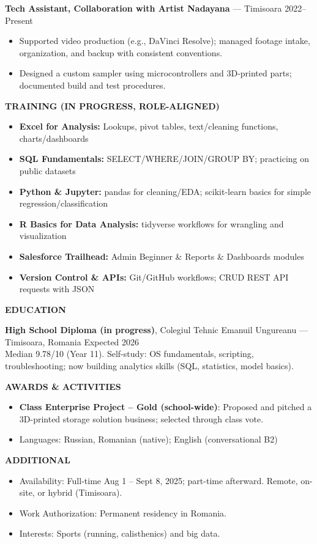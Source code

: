 \documentclass[11pt,a4paper]{article}
\newcommand{\sectionheader}[1]{\vspace{6pt}\textbf{\large #1}\par\vspace{4pt}}
\begin{document}
\textbf{Tech Assistant, Collaboration with Artist Nadayana} — Timisoara \hfill 2022–Present\\[-2pt]
\begin{itemize}
  \item Supported video production (e.g., DaVinci Resolve); managed footage intake, organization, and backup with consistent conventions.
  \item Designed a custom sampler using microcontrollers and 3D-printed parts; documented build and test procedures.
\end{itemize}

\sectionheader{TRAINING (IN PROGRESS, ROLE-ALIGNED)}
\begin{itemize}
  \item \textbf{Excel for Analysis:} Lookups, pivot tables, text/cleaning functions, charts/dashboards
  \item \textbf{SQL Fundamentals:} SELECT/WHERE/JOIN/GROUP BY; practicing on public datasets
  \item \textbf{Python \& Jupyter:} pandas for cleaning/EDA; scikit-learn basics for simple regression/classification
  \item \textbf{R Basics for Data Analysis:} tidyverse workflows for wrangling and visualization
  \item \textbf{Salesforce Trailhead:} Admin Beginner \& Reports \& Dashboards modules
  \item \textbf{Version Control \& APIs:} Git/GitHub workflows; CRUD REST API requests with JSON
\end{itemize}

\sectionheader{EDUCATION}
\textbf{High School Diploma (in progress)}, Colegiul Tehnic Emanuil Ungureanu — Timisoara, Romania \hfill Expected 2026\\
Median 9.78/10 (Year 11). Self-study: OS fundamentals, scripting, troubleshooting; now building analytics skills (SQL, statistics, model basics).

\sectionheader{AWARDS \& ACTIVITIES}
\begin{itemize}
  \item \textbf{Class Enterprise Project – Gold (school-wide)}: Proposed and pitched a 3D-printed storage solution business; selected through class vote.
  \item Languages: Russian, Romanian (native); English (conversational B2)
\end{itemize}

\sectionheader{ADDITIONAL}
\begin{itemize}
  \item Availability: Full-time Aug 1 – Sept 8, 2025; part-time afterward. Remote, on-site, or hybrid (Timisoara).
  \item Work Authorization: Permanent residency in Romania.
  \item Interests: Sports (running, calisthenics) and big data.
\end{itemize}
\end{document}

